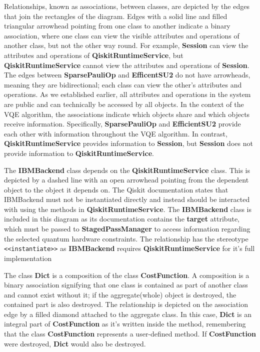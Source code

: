 \documentclass{article}
\begin{document}
Relationships, known as associations, between classes, are depicted by the edges that join the rectangles of the diagram. Edges with a solid line and filled triangular arrowhead pointing from one class to another indicate a binary association, where one class can view the visible attributes and operations of another class, but not the other way round\cite{Seidl_Scholz_Huemer_Kappel_Duffy_2014}. For example, \textbf{Session} can view the attributes and operations of \textbf{QiskitRuntimeService}, but \textbf{QiskitRuntimeService} cannot view the attributes and operations of \textbf{Session}. The edges between \textbf{SparsePauliOp} and \textbf{EfficentSU2} do not have arrowheads, meaning they are bidirectional\cite{Seidl_Scholz_Huemer_Kappel_Duffy_2014}; each class can view the other's attributes and operations. As we established earlier, all attributes and operations in the system are public and can technically be accessed by all objects. In the context of the VQE algorithm, the associations indicate which objects share and which objects receive information. Specifically, \textbf{SparsePauliOp} and \textbf{EfficientSU2} provide each other with information throughout the VQE algorithm. In contrast, \textbf{QiskitRuntimeService} provides information to \textbf{Session}, but \textbf{Session} does not provide information to \textbf{QiskitRuntimeService}.

The \textbf{IBMBackend} class depends on the \textbf{QiskitRuntimeService} class. This is depicted by a dashed line with an open arrowhead pointing from the dependent object to the object it depends on. The Qiskit documentation states that IBMBackend must not be instantiated directly and instead should be interacted with using the methods in \textbf{QiskitRuntimeService}\cite{IBMBackend}. The \textbf{IBMBackend} class is included in this diagram as its documentation contains the \textbf{target} attribute, which must be passed to \textbf{StagedPassManager} to access information regarding the selected quantum hardware constraints. The relationship has the stereotype \texttt{<<instantiate>>} as \textbf{IBMBackend} requires \textbf{QiskitRuntimeService} for it's full implementation\cite{Dependencyrelationships}

The class \textbf{Dict} is a composition of the class \textbf{CostFunction}. A composition is a binary association signifying that one class is contained as part of another class and cannot exist without it; if the aggregate(whole) object is destroyed, the contained part is also destroyed\cite{UMLComposition}. The relationship is depicted on the association edge by a filled diamond attached to the aggregate class. In this case, \textbf{Dict} is an integral part of \textbf{CostFunction} as it's written inside the method, remembering that the class \textbf{CostFunction} represents a user-defined method. If \textbf{CostFunction} were destroyed, \textbf{Dict} would also be destroyed.
\end{document}
